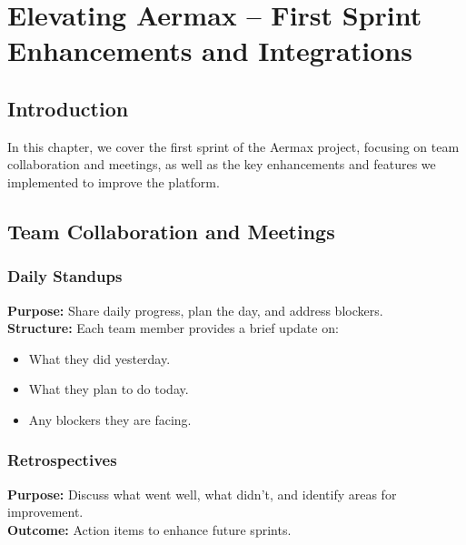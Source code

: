 \chapter{Elevating Aermax – First Sprint Enhancements and Integrations}

\section{Introduction}
In this chapter, we cover the first sprint of the Aermax project, focusing on team collaboration and meetings, as well as the key enhancements and features we implemented to improve the platform.

\section{Team Collaboration and Meetings}

\subsection{Daily Standups}
\textbf{Purpose:} Share daily progress, plan the day, and address blockers. \\
\textbf{Structure:} Each team member provides a brief update on:
\begin{itemize}
    \item What they did yesterday.
    \item What they plan to do today.
    \item Any blockers they are facing.
\end{itemize}

\subsection{Retrospectives}
\textbf{Purpose:} Discuss what went well, what didn’t, and identify areas for improvement. \\
\textbf{Outcome:} Action items to enhance future sprints.

